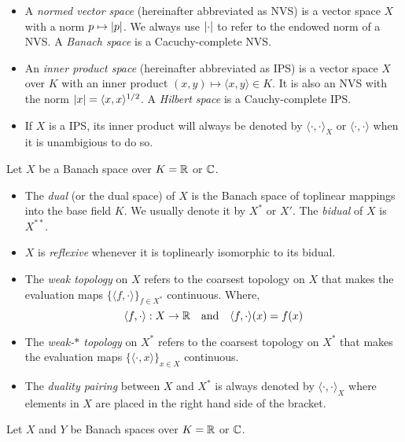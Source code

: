 \documentclass[../main-v2-manifolds.tex]{subfiles}
\begin{document}
\begin{itemize}
    \item A \emph{normed vector space} (hereinafter abbreviated as NVS) is a vector space $X$ with a norm $p\mapsto \vert {p} \vert$. We always use $\vert {\cdot} \vert$ to refer to the endowed norm of a NVS. A \emph{Banach space} is a Cacuchy-complete NVS.
    \item An \emph{inner product space} (hereinafter abbreviated as IPS) is a vector space $X$ over $K$ with an inner product $(x,y)\mapsto \langle x,y\rangle\in K$. It is also an NVS with the norm $\vert {x} \vert=\langle x,x\rangle^{1/2}$. A \emph{Hilbert space} is a Cauchy-complete IPS.
    \item If $X$ is a IPS, its inner product will always be denoted by $\langle \cdot,\cdot\rangle_{X}$ or $\langle \cdot,\cdot\rangle$ when it is unambigious to do so.
\end{itemize}
Let $X$ be a Banach space over $K = \mathbb{R}$ or ${\mathbb{C}}$.
\begin{itemize}
    \item The \emph{dual} (or the dual space) of $X$ is the Banach space of toplinear mappings into the base field $K$. We usually denote it by $X^*$ or $X'$. The \emph{bidual} of $X$ is $X^{**}$.
    \item $X$ is \emph{reflexive} whenever it is toplinearly isomorphic to its bidual.
    \item The \emph{weak topology} on $X$ refers to the coarsest topology on $X$ that makes the evaluation maps $\{\langle f,\cdot\rangle\}_{f\in X^*}$ continuous. Where,
    \[
        \langle f,\cdot\rangle: X\to\real\qqtext{and}\langle f,\cdot\rangle(x) = f(x)
    \]
    \item The \emph{weak-$\ast$ topology} on $X^*$ refers to the coarsest topology on $X^*$ that makes the evaluation maps $\{\langle\cdot, x\rangle\}_{x\in X}$ continuous.
    \item The \emph{duality pairing} between $X$ and $X^*$ is always denoted by $\langle \cdot,\cdot\rangle_{X}$ where elements in $X$ are placed in the right hand side of the bracket.
\end{itemize}
Let $X$ and $Y$ be Banach spaces over $K = \mathbb{R}$ or ${\mathbb{C}}$.
\end{document}
